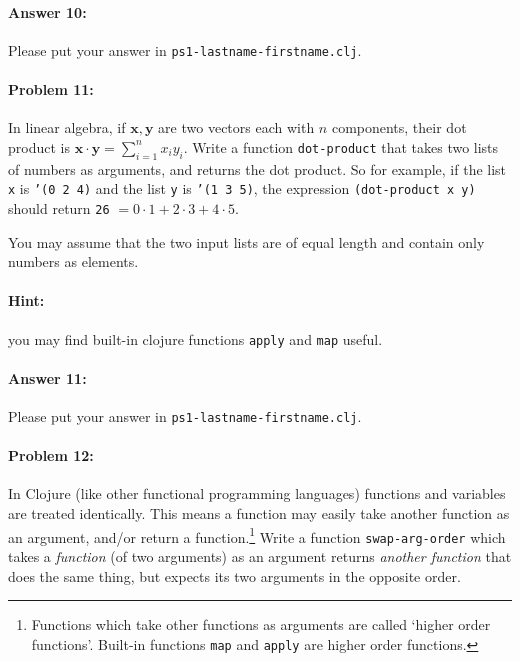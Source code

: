 \documentclass[10pt]{article}
\newcommand{\PSnum}{1}
\begin{document}
\paragraph{Answer 10:} Please put your answer in \texttt{ps\PSnum-lastname-firstname.clj}.

\noindent\hrulefill%

\paragraph{Problem 11:}
In linear algebra, if $\mathbf x, \mathbf y$ are two vectors each with $n$ components, their dot product is $\mathbf x\cdot \mathbf y = \sum_{i=1}^n x_i y_i$. Write a function \texttt{dot-product} that takes two lists of numbers as arguments, and returns the dot product.  So for example, if the list \texttt{x} is \texttt{'(0 2 4)} and the list \texttt{y} is \texttt{'(1 3 5)}, the expression \texttt{(dot-product x y)} should return \texttt{26} $= 0\cdot1 + 2\cdot3 + 4\cdot5$.

You may assume that the two input lists are of equal length and contain only numbers as elements.

\paragraph*{Hint:} you may find built-in clojure functions \texttt{apply} and \texttt{map} useful.

\paragraph{Answer 11:} Please put your answer in \texttt{ps\PSnum-lastname-firstname.clj}.

\noindent\hrulefill%

\paragraph{Problem 12:}
In Clojure (like other functional programming languages) functions and variables
are treated identically.  This means a function may easily take another function
as an argument, and/or return a function.\footnote{Functions which take
other functions as arguments are called `higher order functions'.  Built-in
functions \texttt{map} and \texttt{apply} are higher order functions.}
Write a function \texttt{swap-arg-order} which takes a \emph{function} (of two
arguments) as an argument returns \emph{another function} that does the same
thing, but expects its two arguments in the opposite order.
\end{document}
